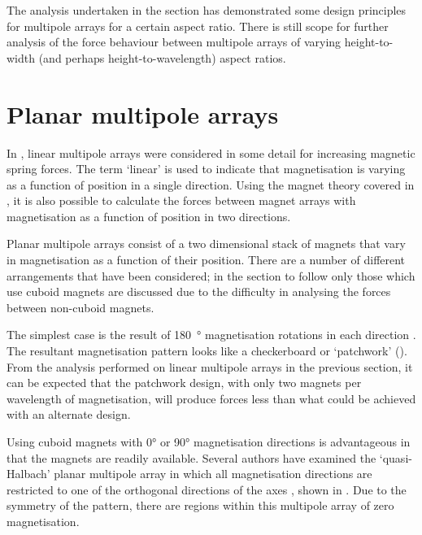 \documentclass[11pt,a4paper]{memoir}
\begin{document}
The analysis undertaken in the section has demonstrated some design principles for multipole arrays for a certain aspect ratio.
There is still scope for further analysis of the force behaviour between multipole arrays of varying height-to-width (and perhaps height-to-wavelength) aspect ratios.


\section{Planar multipole arrays}

In , linear multipole arrays were considered in some detail for increasing magnetic spring forces.
The term `linear' is used to indicate that magnetisation is varying as a function of position in a single direction.
Using the magnet theory covered in , it is also possible to calculate the forces between magnet arrays with magnetisation as a function of position in two directions.

Planar multipole arrays consist of a two dimensional stack of magnets that vary in magnetisation as a function of their position.
There are a number of different arrangements that have been considered; in the section to follow only those which use cuboid magnets are discussed due to the difficulty in analysing the forces between non-cuboid magnets.

The simplest case is the result of \SI{180}{\degree} magnetisation rotations in each direction \cite{kim1997-thesis,cho2001}.
The resultant magnetisation pattern looks like a checkerboard or `patchwork' ().
From the analysis performed on linear multipole arrays in the previous section, it can be expected that the patchwork design, with only two magnets per wavelength of magnetisation, will produce forces less than what could be achieved with an alternate design.

Using cuboid magnets with \ang{0} or \ang{90} magnetisation directions is advantageous in that the magnets are readily available.
Several authors have examined the `quasi-Halbach' planar multipole array in which all magnetisation directions are restricted to one of the orthogonal directions of the axes \cite{moser2002-maglev,rovers2009-ietm,janssen2009-jsdd}, shown in .
Due to the symmetry of the pattern, there are regions within this multipole array of zero magnetisation.
\end{document}
